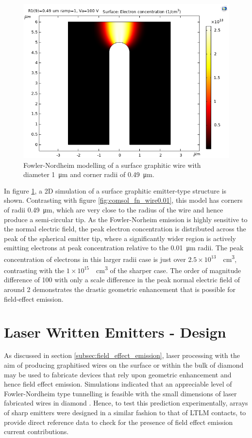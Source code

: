 \begin{refsection}
\begin{figure}[H]
    \centering
    \includegraphics[width=\textwidth]{Chapter7/Figs/Raster/FN radius 0.49 width 1um 100V 0V.png}
    \caption{Fowler-Nordheim modelling of a surface graphitic wire with diameter 1~\si{\micro\metre} and corner radii of 0.49~\si{\micro\metre}.}
    \label{fig:comsol_fn_wire0.49}
\end{figure}

In figure \ref{fig:comsol_fn_wire0.49}, a 2D simulation of a surface graphitic emitter-type structure is shown. Contrasting with figure \ref{fig:comsol_fn_wire0.01}, this model has corners of radii 0.49~\si{\micro\metre}, which are very close to the radius of the wire and hence produce a semi-circular tip. As the Fowler-Norheim emission is highly sensitive to the normal electric field, the peak electron concentration is distributed across the peak of the spherical emitter tip, where a significantly wider region is actively emitting electrons at peak concentration relative to the 0.01~\si{\micro\metre} radii. The peak concentration of electrons in this larger radii case is just over $2.5\times10^{13}$~\si{\per\centi\metre\cubed}, contrasting with the $1\times10^{15}$~\si{\per\centi\metre\cubed} of the sharper case. The order of magnitude difference of 100 with only a scale difference in the peak normal electric field of around 2 demonstrates the drastic geometric enhancement that is possible for field-effect emission.

\section{Laser Written Emitters - Design}
As discussed in section \ref{subsec:field_effect_emission}, laser processing with the aim of producing graphitised wires on the surface or within the bulk of diamond may be used to fabricate devices that rely upon geometric enhancement and hence field effect emission. Simulations indicated that an appreciable level of Fowler-Nordheim type tunnelling is feasible with the small dimensions of laser fabricated wires in diamond \cite{sun2014}. Hence, to test this prediction experimentally, arrays of sharp emitters were designed in a similar fashion to that of LTLM contacts, to provide direct reference data to check for the presence of field effect emission current contributions.

\end{refsection}
